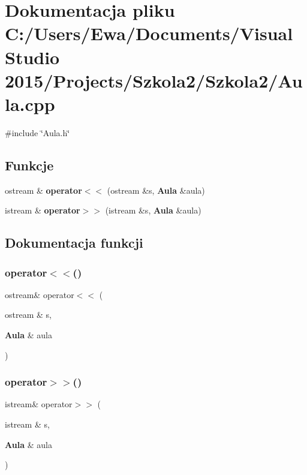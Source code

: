 \section{Dokumentacja pliku C\+:/\+Users/\+Ewa/\+Documents/\+Visual Studio 2015/\+Projects/\+Szkola2/\+Szkola2/\+Aula.cpp}
\label{_aula_8cpp}
{\ttfamily \#include \char`\"{}Aula.\+h\char`\"{}}\newline
\subsection*{Funkcje}
\begin{DoxyCompactItemize}
\item 
ostream \& \textbf{ operator$<$$<$} (ostream \&s, \textbf{ Aula} \&aula)
\item 
istream \& \textbf{ operator$>$$>$} (istream \&s, \textbf{ Aula} \&aula)
\end{DoxyCompactItemize}


\subsection{Dokumentacja funkcji}
\mbox{\label{_aula_8cpp_a4feb487e7f3341c84013188b38984e09}} 
\subsubsection{operator$<$$<$()}
{\footnotesize\ttfamily ostream\& operator$<$$<$ (\begin{DoxyParamCaption}\item[{ostream \&}]{s,  }\item[{\textbf{ Aula} \&}]{aula }\end{DoxyParamCaption})}

\mbox{\label{_aula_8cpp_adff0ed7dade5716526288ec1e16aaccb}} 
\subsubsection{operator$>$$>$()}
{\footnotesize\ttfamily istream\& operator$>$$>$ (\begin{DoxyParamCaption}\item[{istream \&}]{s,  }\item[{\textbf{ Aula} \&}]{aula }\end{DoxyParamCaption})}

